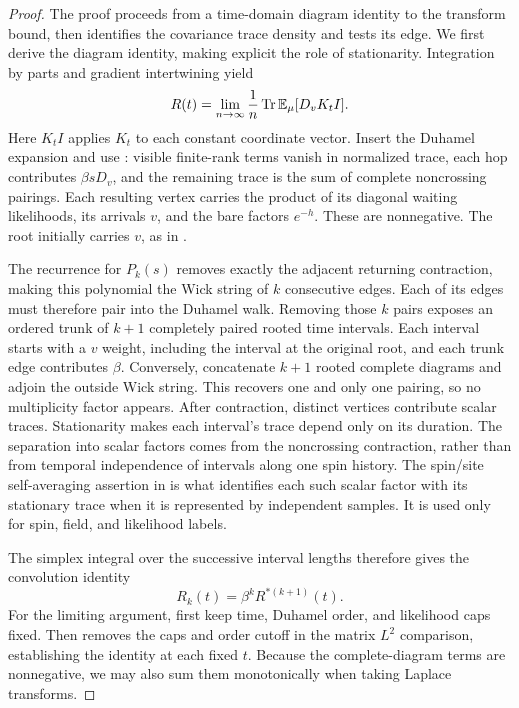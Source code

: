 \begin{proof}
The proof proceeds from a time-domain diagram identity to the transform
bound, then identifies the covariance trace density and tests its edge.
We first derive the diagram identity, making explicit the role of
stationarity.  Integration by parts and gradient intertwining yield
\begin{equation}
 R(t)=\lim_{n\to\infty}\frac1n\operatorname{Tr}\mathbb E_\mu[D_vK_tI].
 \label{eq:spin-gradient-trace}
\end{equation}
Here $K_tI$ applies $K_t$ to each constant coordinate vector.  Insert
the Duhamel expansion and use : visible
finite-rank terms vanish in normalized trace, each hop contributes
$\beta sD_v$, and the remaining trace is the sum of complete
noncrossing pairings.  Each resulting vertex carries the
product of its diagonal waiting likelihoods, its arrivals $v$, and
the bare factors $e^{-h}$.  These are nonnegative.  The root initially
carries $v$, as in .

The recurrence for $P_k(s)$ removes exactly the adjacent returning
contraction, making this polynomial the Wick string of $k$ consecutive
edges.  Each of its edges must therefore pair into the Duhamel walk.
Removing those $k$ pairs exposes an ordered trunk of $k+1$ completely
paired rooted time intervals.  Each interval starts with a $v$ weight,
including the interval at the original root, and each trunk edge
contributes $\beta$.  Conversely, concatenate $k+1$ rooted complete
diagrams and adjoin the outside Wick string.  This recovers one and only
one pairing, so no multiplicity factor appears.  After contraction, distinct vertices contribute scalar traces.
Stationarity makes each interval's trace depend only on its duration.
The separation into scalar factors comes from the noncrossing
contraction, rather than from temporal independence of intervals along
one spin history.  The spin/site self-averaging assertion in
 is what identifies each such scalar factor
with its stationary trace when it is represented by independent
samples.  It is used only for spin, field, and likelihood labels.

The simplex integral over the successive interval lengths therefore
gives the convolution identity
\begin{equation}
 R_k(t)=\beta^k R^{*(k+1)}(t).
 \label{eq:spin-trunk-convolution}
\end{equation}
For the limiting argument, first keep time, Duhamel order, and likelihood
caps fixed.  Then  removes the caps and order
cutoff in the matrix $L^2$ comparison, establishing the identity at
each fixed $t$.  Because the complete-diagram terms are nonnegative,
we may also sum them monotonically when taking Laplace transforms.


\end{proof}
